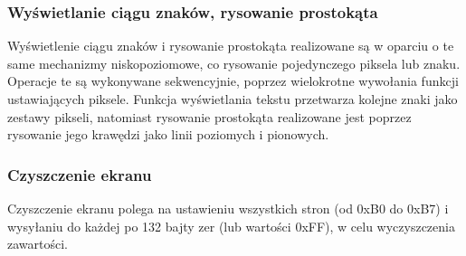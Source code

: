 \subsubsection{Wyświetlanie ciągu znaków, rysowanie prostokąta}

Wyświetlenie ciągu znaków i rysowanie prostokąta realizowane są w oparciu o te same mechanizmy niskopoziomowe, co rysowanie pojedynczego piksela lub znaku. Operacje te są wykonywane sekwencyjnie, poprzez wielokrotne wywołania funkcji ustawiających piksele. Funkcja wyświetlania tekstu przetwarza kolejne znaki jako zestawy pikseli, natomiast rysowanie prostokąta realizowane jest poprzez rysowanie jego krawędzi jako linii poziomych i pionowych.

\subsubsection{Czyszczenie ekranu}
Czyszczenie ekranu polega na ustawieniu wszystkich stron (od 0xB0 do 0xB7) i wysyłaniu do każdej po 132 bajty zer (lub wartości 0xFF), w celu wyczyszczenia zawartości.

